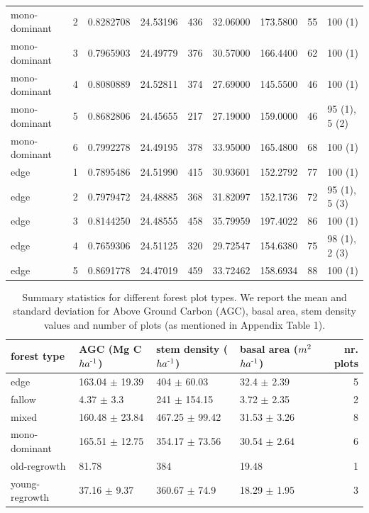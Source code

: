 \documentclass[landscape]{article}
\begin{document}
\begin{table}[!h]
\begin{tabular}[t]{lrrrrrrrl}
\addlinespace
mono-dominant & 2 & 0.8282708 & 24.53196 & 436 & 32.06000 & 173.5800 & 55 & 100 (1)\\
mono-dominant & 3 & 0.7965903 & 24.49779 & 376 & 30.57000 & 166.4400 & 62 & 100 (1)\\
mono-dominant & 4 & 0.8080889 & 24.52811 & 374 & 27.69000 & 145.5500 & 46 & 100 (1)\\
mono-dominant & 5 & 0.8682806 & 24.45655 & 217 & 27.19000 & 159.0000 & 46 & 95 (1), 5 (2)\\
mono-dominant & 6 & 0.7992278 & 24.49195 & 378 & 33.95000 & 165.4800 & 68 & 100 (1)\\
\addlinespace
edge & 1 & 0.7895486 & 24.51990 & 415 & 30.93601 & 152.2792 & 77 & 100 (1)\\
edge & 2 & 0.7979472 & 24.48885 & 368 & 31.82097 & 152.1736 & 72 & 95 (1), 5 (3)\\
edge & 3 & 0.8144250 & 24.48555 & 458 & 35.79959 & 197.4022 & 86 & 100 (1)\\
edge & 4 & 0.7659306 & 24.51125 & 320 & 29.72547 & 154.6380 & 75 & 98 (1), 2 (3)\\
edge & 5 & 0.8691778 & 24.47019 & 459 & 33.72462 & 158.6934 & 88 & 100 (1)\\
\bottomrule
\end{tabular}
\end{table}

\begin{table}[!h]

\caption{\label{tab:unnamed-chunk-3}Summary statistics for different forest plot types. We report the mean and standard deviation for Above Ground Carbon (AGC), basal area, stem density values and number of plots (as mentioned in Appendix Table 1).}
\centering
\begin{tabular}[t]{llllr}
\toprule
forest type & AGC (Mg C $ha\textsuperscript{-1}$) & stem density ($ha\textsuperscript{-1}$) & basal area ($m\textsuperscript{2}$ $ha\textsuperscript{-1}$) & nr. plots\\
\midrule
edge & 163.04 $\pm$ 19.39 & 404 $\pm$ 60.03 & 32.4 $\pm$ 2.39 & 5\\
fallow & 4.37 $\pm$ 3.3 & 241 $\pm$ 154.15 & 3.72 $\pm$ 2.35 & 2\\
mixed & 160.48 $\pm$ 23.84 & 467.25 $\pm$ 99.42 & 31.53 $\pm$ 3.26 & 8\\
mono-dominant & 165.51 $\pm$ 12.75 & 354.17 $\pm$ 73.56 & 30.54 $\pm$ 2.64 & 6\\
old-regrowth & 81.78 & 384 & 19.48 & 1\\
\addlinespace
young-regrowth & 37.16 $\pm$ 9.37 & 360.67 $\pm$ 74.9 & 18.29 $\pm$ 1.95 & 3\\
\bottomrule
\end{tabular}
\end{table}
\end{document}
